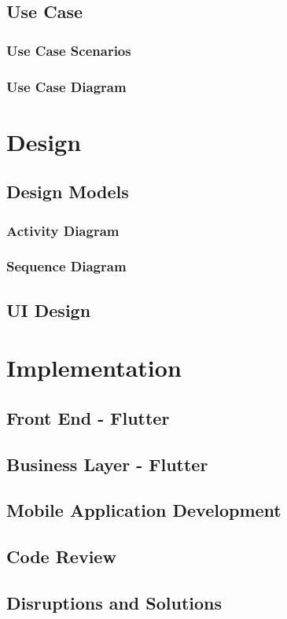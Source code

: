 \documentclass{report}
\begin{document}
\section{Use Case}
	\subsection{Use Case Scenarios}
	\subsection{Use Case Diagram}
	
\chapter{Design}
	\section{Design Models}
		\subsection{Activity Diagram}
		\subsection{Sequence Diagram}
	\section{UI Design}

\chapter{Implementation}
	\section{Front End - Flutter}
	\section{Business Layer - Flutter}
	\section{Mobile Application Development}
	\section{Code Review}
	\section{Disruptions and Solutions}
\end{document}
